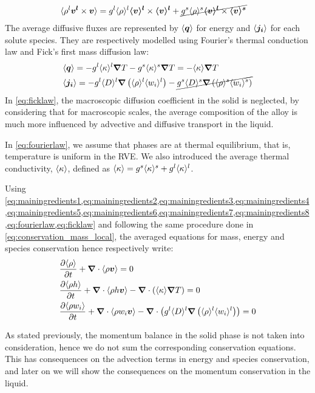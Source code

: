 \begin{align}
\label{eq:mainingredients8}
& \langle \rho^l \boldsymbol{v^l} \times \boldsymbol{v} \rangle = {g^l} \langle \rho \rangle^l \boldsymbol{\langle v \rangle^l} \times \boldsymbol{\langle v \rangle^l} + \cancel{{g^s} \langle \rho \rangle^s \boldsymbol{\langle v \rangle^l} \times \boldsymbol{\langle v \rangle^s}}
\end{align}
The average diffusive fluxes are represented by $\langle \boldsymbol{q} \rangle$ for energy and $\langle \boldsymbol{j_i} \rangle$ for each solute species.
They are respectively modelled using Fourier's thermal conduction law and Fick's first mass diffusion law:
\begin{align}
\label{eq:fourierlaw}
& \langle \boldsymbol{q} \rangle = - {g^l} \langle \kappa \rangle^l \boldsymbol{\nabla} T -  {g^s} \langle \kappa \rangle^s \boldsymbol{\nabla} T = -\langle \kappa \rangle \boldsymbol{\nabla} T \\
\label{eq:ficklaw}
& \langle \boldsymbol{j_i} \rangle = - {g^l} \langle D \rangle^l \boldsymbol{\nabla} \left( \langle \rho \rangle^l \langle w_i \rangle^l \right) - \cancel{{g^s} \langle D \rangle^s \boldsymbol{\nabla} \left( \langle \rho \rangle^s \langle w_i \rangle^s \right)}
\end{align}
In \cref{eq:ficklaw}, the macroscopic diffusion coefficient in the solid is neglected, 
by considering that for macroscopic scales, the average composition of the alloy is much more influenced by advective 
and diffusive transport in the liquid.

In \cref{eq:fourierlaw}, we assume that phases are at thermal equilibrium, that is, temperature is uniform in the RVE.
We also introduced the average thermal conductivity, $\langle \kappa \rangle$, defined as $\langle \kappa \rangle={g^s} \langle \kappa \rangle^s + {g^l} \langle \kappa \rangle^l$.

Using \cref{eq:mainingredients1,eq:mainingredients2,eq:mainingredients3,eq:mainingredients4,eq:mainingredients5,eq:mainingredients6,eq:mainingredients7,eq:mainingredients8,eq:fourierlaw,eq:ficklaw}
and following the same procedure done in \cref{eq:conservation_mass_local}, the averaged equations for mass, energy and species conservation hence respectively write:
\begin{align}
\label{eq:conservation_mass}
& \frac{\partial \langle \rho \rangle}{\partial t} + \boldsymbol{\nabla} \cdot \langle \rho \boldsymbol{v} \rangle = 0 \\
\label{eq:conservation_energy_init}
& \frac{\partial \langle \rho h \rangle}{\partial t} + \boldsymbol{\nabla} \cdot \langle \rho h \boldsymbol{v} \rangle - \boldsymbol{\nabla} \cdot \left( \langle \kappa \rangle \boldsymbol{\nabla} T \right) = 0 \\
\label{eq:conservation_solute_init}
& \frac{\partial \langle \rho w_i \rangle}{\partial t} + \boldsymbol{\nabla} \cdot \langle \rho w_i \boldsymbol{v} \rangle - \boldsymbol{\nabla} \cdot \left( {g^l} \langle D \rangle^l \boldsymbol{\nabla} \left( \langle \rho \rangle^l \langle w_i \rangle^l \right) \right)= 0
\end{align}

As stated previously, the momentum balance in the solid phase is not taken into consideration, hence we do not sum the corresponding
conservation equations. This has consequences on the advection terms in energy and species conservation, and later on we will show
the consequences on the momentum conservation in the liquid. 

